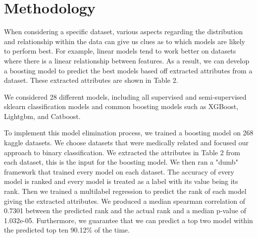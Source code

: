 \documentclass{article}
\begin{document}
\section{Methodology}
When considering a specific dataset, various aspects regarding the distribution and relationship within the data can give us clues as to which models are likely to perform best. For example, linear models tend to work better on datasets where there is a linear relationship between features. As a result, we can develop a boosting model to predict the best models based off extracted attributes from a dataset. These extracted attributes are shown in Table 2. 

We considered 28 different models, including all supervised and semi-supervised sklearn classification models and common boosting models such as XGBoost, Lightgbm, and Catboost.

To implement this model elimination process, we trained a boosting model on 268 kaggle datasets. We choose datasets that were medically related and focused our approach to binary classification. We extracted the attributes in Table 2 from each dataset, this is the input for the boosting model. We then ran a "dumb" framework that trained every model on each dataset. The accuracy of every model is ranked and every model is treated as a label with its value being its rank. Then we trained a multilabel regression to predict the rank of each model giving the extracted attributes. We produced a median spearman correlation of 0.7301 between the predicted rank and the actual rank and a median p-value of 1.032e-05. Furthermore, we guarantee that we can predict a top two model within the predicted top ten 90.12\% of the time.
\end{document}
